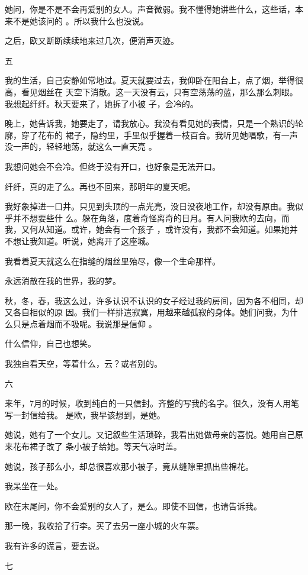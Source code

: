 \documentclass[12pt,a4paper]{article}
\newcommand{\subpart}[1]{
	\begingroup \par
	\vspace{1ex} \centering #1
	\par \endgroup
}
\begin{document}
		她问，你是不是不会再爱别的女人。声音微弱。我不懂得她讲些什么，这些话，本来不是她该问的
	。所以我什么也没说。

		之后，欧又断断续续地来过几次，便消声灭迹。

		\subpart{五}

		我的生活，自己安静如常地过。夏天就要过去，我仰卧在阳台上，点了烟，举得很高，看见烟丝在
	天空下消散。这一天没有云，只有空荡荡的蓝，那么那么刺眼。我想起纤纤。秋天要来了，她拆了小被
	子，会冷的。

		晚上，她告诉我，她要走了，请我放心。我没有看见她的表情，只是一个熟识的轮廓，穿了花布的
	裙子，隐约里，手里似乎握着一枝百合。我听见她唱歌，有一声没一声的，轻轻地荡，就这么一直天亮
	。

		我想问她会不会冷。但终于没有开口，也好象是无法开口。\par
		纤纤，真的走了么。再也不回来，那明年的夏天呢。

		我好象掉进一口井。只见到头顶的一点光亮，没日没夜地工作，却没有原由。我似乎并不想要些什
	么。躲在角落，度着奇怪离奇的日月。有人问我欧的去向，而我，又何从知道。或许，她会有一个孩子
	，或许没有，我都不会知道。如果她并不想让我知道。听说，她离开了这座城。

		我看着夏天就这么在指缝的烟丝里殆尽，像一个生命那样。\par
		永远消散在我的世界，我的梦。

		秋，冬，春，我这么过，许多认识不认识的女子经过我的房间，因为各不相同，却又各自相似的原
	因。我们一样排遣寂寞，用越来越孤寂的身体。她们问我，为什么只是点着烟而不吸呢。我说那是信仰
	。

		什么信仰，自己也想笑。\par
		我独自看天空，等着什么，云？或者别的。

		\subpart{六}

		来年，7月的时候，收到纯白的一只信封。齐整的写我的名字。很久，没有人用笔写一封信给我。
	是欧，我早该想到，是她。

		她说，她有了一个女儿。又记叙些生活琐碎，我看出她做母亲的喜悦。她用自己原来花布裙子改了
	条小被子给她。等天气凉时盖。

		她说，孩子那么小，却总很喜欢那小被子，竟从缝隙里抓出些棉花。\par
		我呆坐在一处。\par
		欧在末尾问，你不会爱别的女人了，是么。即使不回信，也请告诉我。\par
		那一晚，我收拾了行李。买了去另一座小城的火车票。\par
		我有许多的谎言，要去说。

		\subpart{七}
\end{document}
